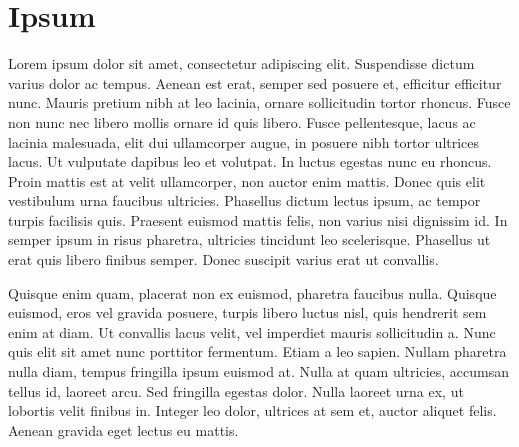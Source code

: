 

\chapter{Ipsum}
\label{ipsum:cha}

Lorem ipsum dolor sit amet, consectetur adipiscing elit. Suspendisse dictum varius dolor ac tempus. Aenean est erat, semper sed posuere et, efficitur efficitur nunc. Mauris pretium nibh at leo lacinia, ornare sollicitudin tortor rhoncus. Fusce non nunc nec libero mollis ornare id quis libero. Fusce pellentesque, lacus ac lacinia malesuada, elit dui ullamcorper augue, in posuere nibh tortor ultrices lacus. Ut vulputate dapibus leo et volutpat. In luctus egestas nunc eu rhoncus. Proin mattis est at velit ullamcorper, non auctor enim mattis. Donec quis elit vestibulum urna faucibus ultricies. Phasellus dictum lectus ipsum, ac tempor turpis facilisis quis. Praesent euismod mattis felis, non varius nisi dignissim id. In semper ipsum in risus pharetra, ultricies tincidunt leo scelerisque. Phasellus ut erat quis libero finibus semper. Donec suscipit varius erat ut convallis.

Quisque enim quam, placerat non ex euismod, pharetra faucibus nulla. Quisque euismod, eros vel gravida posuere, turpis libero luctus nisl, quis hendrerit sem enim at diam. Ut convallis lacus velit, vel imperdiet mauris sollicitudin a. Nunc quis elit sit amet nunc porttitor fermentum. Etiam a leo sapien. Nullam pharetra nulla diam, tempus fringilla ipsum euismod at. Nulla at quam ultricies, accumsan tellus id, laoreet arcu. Sed fringilla egestas dolor. Nulla laoreet urna ex, ut lobortis velit finibus in. Integer leo dolor, ultrices at sem et, auctor aliquet felis. Aenean gravida eget lectus eu mattis.

